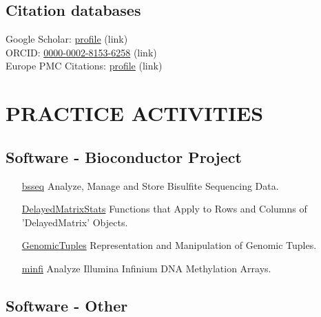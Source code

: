 \documentclass[11pt,letterpaper,pdf]{article}
\begin{document}
\printbibliography[title=Preprints (not peer reviewed),keyword=preprint,prenote=mynote]

\printbibliography[title={Theses, Editorials},keyword=others,prenote=mynote]

\printbibliography[title={Preprints, subsequently published (not peer reviewed)},keyword=pubpreprint,prenote=mynote]

\subsection*{Citation databases}

\vspace*{0.5\baselineskip}

Google Scholar: \href{https://scholar.google.com.au/citations?user=pQhJuagAAAAJ&hl=en}{profile} (link)\\
ORCID: \href{https://orcid.org/0000-0002-8153-6258}{0000-0002-8153-6258} (link)\\
Europe PMC Citations: \href{https://europepmc.org/authors/0000-0002-8153-6258}{profile} (link)

\section*{PRACTICE ACTIVITIES}

\subsection*{Software - Bioconductor Project}


\begin{enumerate}[labelindent=1cm,align=left]
  \item[\href{http://www.bioconductor.org/packages/bsseq}{bsseq}]
    Analyze, Manage and Store Bisulfite Sequencing Data.
  \item[\href{http://www.bioconductor.org/packages/DelayedMatrixStats}{DelayedMatrixStats}]
    Functions that Apply to Rows and Columns of 'DelayedMatrix' Objects.
  \item[\href{http://www.bioconductor.org/packages/GenomicTuples}{GenomicTuples}]
    Representation and Manipulation of Genomic Tuples.
  \item[\href{http://www.bioconductor.org/packages/minfi}{minfi}]
    Analyze Illumina Infinium DNA Methylation Arrays.
\end{enumerate}

\subsection*{Software - Other}
\end{document}
